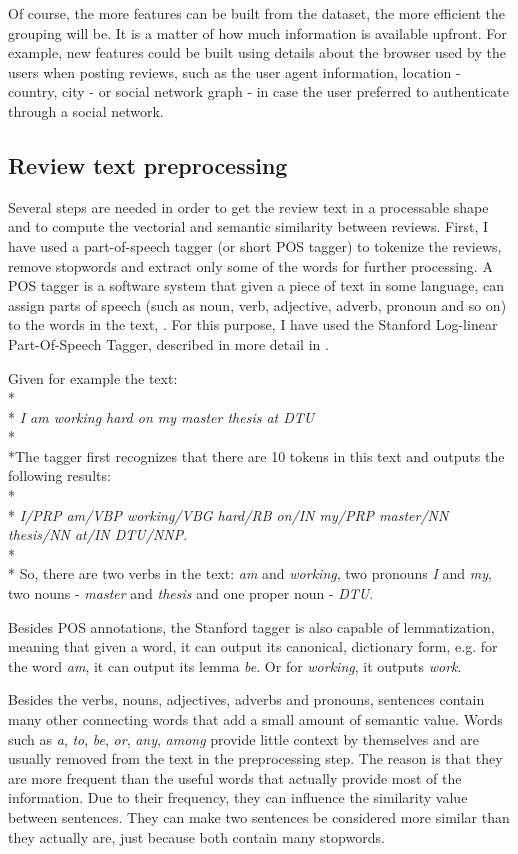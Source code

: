 Of course, the more features can be built from the dataset, the more efficient the grouping will be. It is a matter of how much information is available upfront. For example, new features could be built using details about the browser used by the users when posting reviews, such as the user agent information, location - country, city - or social network graph - in case the user preferred to authenticate through a social network.

\subsection{Review text preprocessing}

Several steps are needed in order to get the review text in a processable shape and to compute the vectorial and semantic similarity between reviews. First, I have used a part-of-speech tagger (or short POS tagger) to tokenize the reviews, remove stopwords and extract only some of the words for further processing. A POS tagger is a software system that given a piece of text in some language, can assign parts of speech (such as noun, verb, adjective, adverb, pronoun and so on) to the words in the text, \citet{StanfordNLPTagger}.
For this purpose, I have used the Stanford Log-linear Part-Of-Speech Tagger, described in more detail in \citet{Toutanova2003}.

Given for example the text:
\\*
\\*
\textit{I am working hard on my master thesis at DTU}
\\*
\\*The tagger first recognizes that there are 10 tokens in this text and outputs the following results:
\\*
\\*
\textit{I/PRP am/VBP working/VBG hard/RB on/IN my/PRP master/NN thesis/NN at/IN DTU/NNP}.
\\*
\\*
So, there are two verbs in the text: \textit{am} and \textit{working}, two pronouns \textit{I} and \textit{my}, two nouns - \textit{master} and \textit{thesis} and one proper noun - \textit{DTU}.

Besides POS annotations, the Stanford tagger is also capable of lemmatization, meaning that given a word, it can output its canonical, dictionary form, e.g. for the word \textit{am}, it can output its lemma \textit{be}. Or for \textit{working}, it outputs \textit{work}. 

Besides the verbs, nouns, adjectives, adverbs and pronouns, sentences contain many other connecting words that add a small amount of semantic value. Words such as \textit{a}, \textit{to}, \textit{be}, \textit{or}, \textit{any}, \textit{among} provide little context by themselves and are usually removed from the text in the preprocessing step. The reason is that they are more frequent than the useful words that actually provide most of the information. Due to their frequency, they can influence the similarity value between sentences. They can make two sentences be considered more similar than they actually are, just because both contain many stopwords. 

